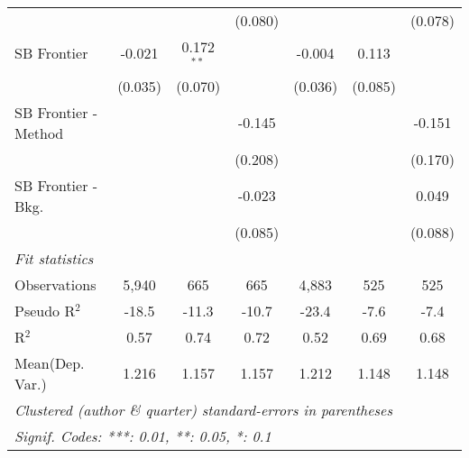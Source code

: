\begin{tabular}{lcccccc}
                        &         &              & (0.080)       &         &              & (0.078)\\   
   SB Frontier          & -0.021  & 0.172$^{**}$ &               & -0.004  & 0.113        &   \\   
                        & (0.035) & (0.070)      &               & (0.036) & (0.085)      &   \\   
   SB Frontier - Method &         &              & -0.145        &         &              & -0.151\\   
                        &         &              & (0.208)       &         &              & (0.170)\\   
   SB Frontier - Bkg.   &         &              & -0.023        &         &              & 0.049\\   
                        &         &              & (0.085)       &         &              & (0.088)\\   
   \midrule
   \emph{Fit statistics}\\
   Observations         & 5,940   & 665          & 665           & 4,883   & 525          & 525\\  
   Pseudo R$^2$         & -18.5   & -11.3        & -10.7         & -23.4   & -7.6         & -7.4\\  
   R$^2$                & 0.57    & 0.74         & 0.72          & 0.52    & 0.69         & 0.68\\  
Mean(Dep. Var.) & 1.216 & 1.157 & 1.157 & 1.212 & 1.148 & 1.148 \\
   \midrule \midrule
   \multicolumn{7}{l}{\emph{Clustered (author \& quarter) standard-errors in parentheses}}\\
   \multicolumn{7}{l}{\emph{Signif. Codes: ***: 0.01, **: 0.05, *: 0.1}}\\
\end{tabular}
\par\endgroup
